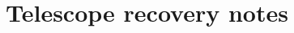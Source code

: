 \documentclass[10pt]{report}
\begin{document}


\chapter{Telescope recovery notes}

%
%
%
%


\printindex
\end{document}
